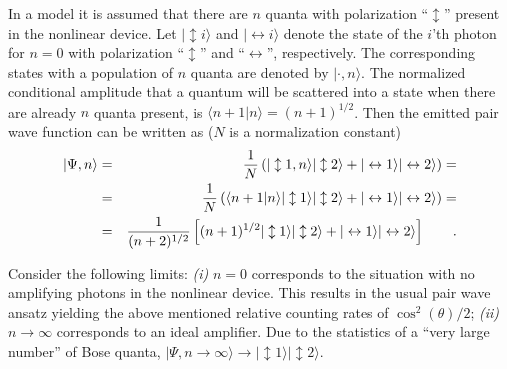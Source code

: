       In a  model  it is assumed that there are
 $n$
 quanta with polarization ``$\updownarrow$'' present in the nonlinear
 device.  Let $\vert \updownarrow i\rangle $ and $\vert \leftrightarrow
 i\rangle $ denote the state of the $i$'th photon for $n=0$ with
 polarization ``$\updownarrow $'' and ``$\leftrightarrow $'',
 respectively.
 The corresponding states with a population of $n$ quanta are denoted
 by $\vert
 \cdot , n\rangle $. The normalized conditional amplitude that a
 quantum will be
 scattered into a state when there are already $n$ quanta present, is
 \cite{feynman-III} $\langle n+1\vert n\rangle =(n+1)^{1/2}$.  Then the
 emitted pair wave function can be written as ($N$ is a normalization
 constant)
 \begin{eqnarray}
 \vert \Psi ,n\rangle &=&{1\over N} \left( \vert \updownarrow
 1,n\rangle \vert \updownarrow 2\rangle +\vert \leftrightarrow 1\rangle
 \vert \leftrightarrow 2\rangle \right) =\nonumber \\
&=&{1\over N} \left(
   \langle n+1\vert n\rangle
 \vert \updownarrow 1 \rangle   \vert
 \updownarrow 2    \rangle
 +\vert \leftrightarrow 1\rangle \vert \leftrightarrow
 2\rangle \right) =\nonumber \\
&=&{1\over (n+2)^{1/2}} \left[ (n+1)^{1/2} \vert
 \updownarrow 1\rangle \vert \updownarrow 2\rangle + \vert
 \leftrightarrow 1\rangle \vert \leftrightarrow 2\rangle
 \right] \qquad .
 \end{eqnarray}


      Consider the following limits: {\it (i)} $n=0$ corresponds to the
 situation with no amplifying photons in the nonlinear device.  This
 results in the usual pair wave ansatz yielding the
 above mentioned relative counting rates of $\cos^2(\theta )/2$;
 {\it (ii)}
 $n\longrightarrow
 \infty$ corresponds to an ideal amplifier.  Due to the statistics of a
 ``very large number'' of Bose quanta, $\vert \Psi
 ,n\longrightarrow \infty \rangle
 \longrightarrow \vert \updownarrow 1\rangle \vert \updownarrow
 2\rangle $.



